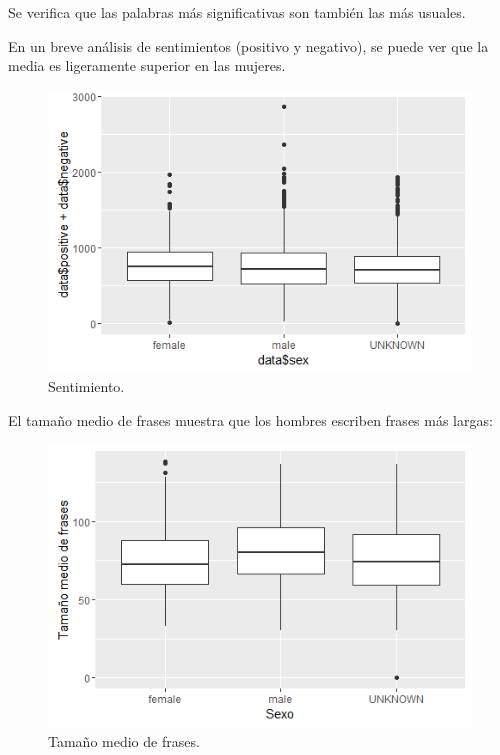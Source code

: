 \documentclass[11pt,a4paper]{article}
\begin{document}
  Se verifica que las palabras m\'as significativas son tambi\'en las m\'as usuales.
  
  En un breve an\'alisis de sentimientos (positivo y negativo), se puede ver que la media es ligeramente superior en las mujeres.
  
  \begin{figure}[ht!]
    \includegraphics[width=\linewidth]{sentiment.png}
    \caption{Sentimiento.}
    \label{fig:sentiment}
  \end{figure}
  
  El tama\~no medio de frases muestra que los hombres escriben frases m\'as largas:

  \begin{figure}[ht!]
    \includegraphics[width=\linewidth]{sentence_mean.png}
    \caption{Tama\~no medio de frases.}
    \label{fig:sentence_mean}
  \end{figure}
  
\end{document}
